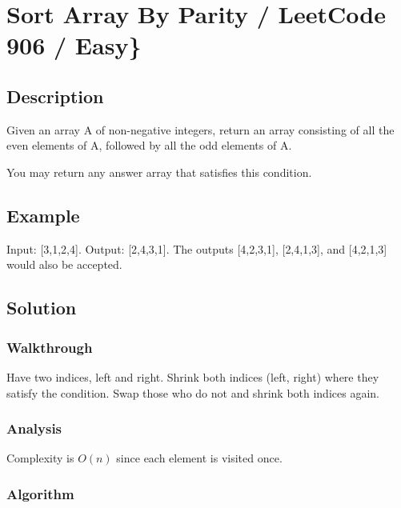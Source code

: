 \documentclass[]{book}
\begin{document}
\hypertarget{sort-array-by-parity-leetcode-906-easy}{%
\section{Sort Array By Parity / LeetCode 906 / Easy\}}\label{sort-array-by-parity-leetcode-906-easy}}

\hypertarget{description-18}{%
\subsection{Description}\label{description-18}}

Given an array A of non-negative integers, return an array consisting of all the even elements of A, followed by all
the odd elements of A.

You may return any answer array that satisfies this condition.

\hypertarget{example-17}{%
\subsection{Example}\label{example-17}}

Input: {[}3,1,2,4{]}. Output: {[}2,4,3,1{]}. The outputs {[}4,2,3,1{]}, {[}2,4,1,3{]}, and {[}4,2,1,3{]} would also be accepted.

\hypertarget{solution-13}{%
\subsection{Solution}\label{solution-13}}

\hypertarget{walkthrough-17}{%
\subsubsection{Walkthrough}\label{walkthrough-17}}

Have two indices, left and right. Shrink both indices (left, right) where they satisfy the condition. Swap those
who do not and shrink both indices again.

\hypertarget{analysis-19}{%
\subsubsection{Analysis}\label{analysis-19}}

Complexity is \(O(n)\) since each element is visited once.

\hypertarget{algorithm-19}{%
\subsubsection{Algorithm}\label{algorithm-19}}
\end{document}
